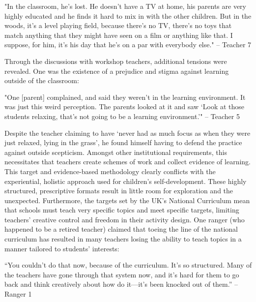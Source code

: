 \begin{displayquote}
"In the classroom, he's lost. He doesn't have a TV at home, his parents are very highly educated and he finds it hard to mix in with the other children. But in the woods, it's a level playing field, because there's no TV, there's no toys that match anything that they might have seen on a film or anything like that. I suppose, for him, it’s his day that he’s on a par with everybody else." – Teacher 7
\end{displayquote}

Through the discussions with workshop teachers, additional tensions were revealed.  One was the existence of a prejudice and stigma against learning outside of the classroom:

\begin{displayquote}
"One [parent] complained, and said they weren't in the learning environment. It was just this weird perception. The parents looked at it and saw `Look at those students relaxing, that’s not going to be a learning environment.'" – Teacher 5
\end{displayquote}

Despite the teacher claiming to have `never had as much focus as when they were just relaxed, lying in the grass', he found himself having to defend the practice against outside scepticism. Amongst other institutional requirements, this necessitates that teachers create schemes of work and collect evidence of learning. This target and evidence-based methodology clearly conflicts with the experiential, holistic approach used for children’s self-development. These highly structured, prescriptive formats result in little room for exploration and the unexpected. Furthermore, the targets set by the UK’s National Curriculum mean that schools must teach very specific topics and meet specific targets, limiting teachers’ creative control and freedom in their activity design. One ranger (who happened to be a retired teacher) claimed that toeing the line of the national curriculum has resulted in many teachers losing the ability to teach topics in a manner tailored to students’ interests:

\begin{displayquote}
“You couldn't do that now, because of the curriculum. It’s so structured. Many of the teachers have gone through that system now, and it’s hard for them to go back and think creatively about how do it---it’s been knocked out of them.” – Ranger 1
\end{displayquote}

